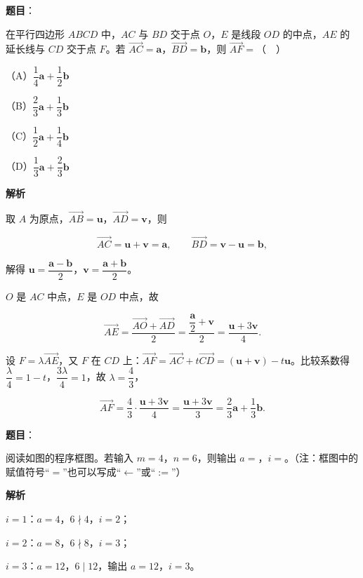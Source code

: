 \begin{answer}

\textbf{题目}：

在平行四边形 $ABCD$ 中，$AC$ 与 $BD$ 交于点 $O$，$E$ 是线段 $OD$ 的中点，$AE$ 的延长线与 $CD$ 交于点 $F$。若 $\overrightarrow{AC}=\boldsymbol a$，$\overrightarrow{BD}=\boldsymbol b$，则 $\overrightarrow{AF}=$（　）

（A）$\dfrac14\boldsymbol a+\dfrac12\boldsymbol b$

（B）$\dfrac23\boldsymbol a+\dfrac13\boldsymbol b$

（C）$\dfrac12\boldsymbol a+\dfrac14\boldsymbol b$

（D）$\dfrac13\boldsymbol a+\dfrac23\boldsymbol b$

\textbf{解析}

取 $A$ 为原点，$\overrightarrow{AB}=\boldsymbol u$，$\overrightarrow{AD}=\boldsymbol v$，则

\nopagebreak[4]
\[\overrightarrow{AC}=\boldsymbol u+\boldsymbol v=\boldsymbol a,\qquad \overrightarrow{BD}=\boldsymbol v-\boldsymbol u=\boldsymbol b,\]

解得 $\boldsymbol u=\dfrac{\boldsymbol a-\boldsymbol b}2$，$\boldsymbol v=\dfrac{\boldsymbol a+\boldsymbol b}2$。

$O$ 是 $AC$ 中点，$E$ 是 $OD$ 中点，故

\nopagebreak[4]
\[\overrightarrow{AE}=\frac{\overrightarrow{AO}+\overrightarrow{AD}}2=\frac{\dfrac{\boldsymbol a}2+\boldsymbol v}2=\frac{\boldsymbol u+3\boldsymbol v}4.\]

设 $F=\lambda\overrightarrow{AE}$，又 $F$ 在 $CD$ 上：$\overrightarrow{AF}=\overrightarrow{AC}+t\overrightarrow{CD}=(\boldsymbol u+\boldsymbol v)-t\boldsymbol u$。比较系数得 $\dfrac{\lambda}4=1-t$，$\dfrac{3\lambda}4=1$，故 $\lambda=\dfrac43$，

\nopagebreak[4]
\[\overrightarrow{AF}=\frac43\cdot\frac{\boldsymbol u+3\boldsymbol v}4=\frac{\boldsymbol u+3\boldsymbol v}3=\frac23\boldsymbol a+\frac13\boldsymbol b.\]


\end{answer}
\begin{answer}

\textbf{题目}：

阅读如图的程序框图。若输入 $m=4$，$n=6$，则输出 $a=$\gkblank{}，$i=$\gkblank{}。（注：框图中的赋值符号“$=$”也可以写成“$\leftarrow$”或“$:=$”）
\nopagebreak[4]
\begin{center}\end{center}
\nopagebreak[4]
\textbf{解析}

$i=1$：$a=4$，$6\nmid4$，$i=2$；

$i=2$：$a=8$，$6\nmid8$，$i=3$；

$i=3$：$a=12$，$6\mid12$，输出 $a=12$，$i=3$。


\end{answer}
